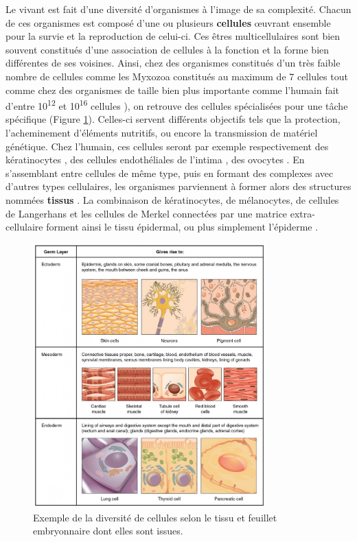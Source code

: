 Le vivant est fait d'une diversité d'organismes à l'image de sa complexité. Chacun de ces organismes est composé d'une ou plusieurs \textbf{cellules} œuvrant ensemble pour la survie et la reproduction de celui-ci. Ces êtres multicellulaires sont bien souvent constitués d’une association de cellules à la fonction et la forme bien différentes de ses voisines. Ainsi, chez des organismes constitués d'un très faible nombre de cellules comme les Myxozoa constitués au maximum de 7 cellules \cite{Morris2010Aug} tout comme chez des organismes de taille bien plus importante comme l'humain fait d'entre 10\textsuperscript{12} et 10\textsuperscript{16} cellules \cite{Bianconi2013}), on retrouve des cellules spécialisées pour une tâche spécifique \cite{Panina2020Sep} (Figure \ref{fig:intro_tissu_type_cellulaire}). Celles-ci servent différents objectifs tels que la protection, l'acheminement d'éléments nutritifs, ou encore la transmission de matériel génétique. Chez l’humain, ces cellules seront par exemple respectivement des kératinocytes \cite{Yuki2007Apr}, des cellules endothéliales de l’intima \cite{Yuan1991Aug}, des ovocytes \cite{Trounson2013}. En s’assemblant entre cellules de même type, puis en formant des complexes avec d’autres types cellulaires, les organismes parviennent à former alors des structures nommées \textbf{tissus} \cite{Hekselman2020Mar}. La combinaison de kératinocytes, de mélanocytes, de cellules de Langerhans et les cellules de Merkel connectées par une matrice extra-cellulaire forment ainsi le tissu épidermal, ou plus simplement l’épiderme \cite{Bettley1965}.

\begin{figure}[hb!]
    \centering
    \includegraphics[width=0.8\textwidth]{img/intro/cell_type_feuillet.jpg}
    \caption{Exemple de la diversité de cellules selon le tissu et feuillet embryonnaire dont elles sont issues.}
    \label{fig:intro_tissu_type_cellulaire}
\end{figure}

